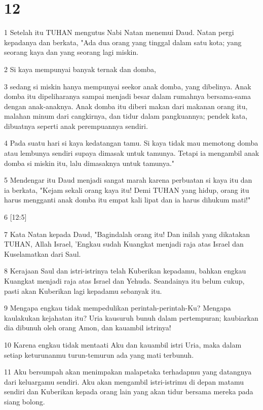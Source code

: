 \chapter{12}

\par 1 Setelah itu TUHAN mengutus Nabi Natan menemui Daud. Natan pergi kepadanya dan berkata, "Ada dua orang yang tinggal dalam satu kota; yang seorang kaya dan yang seorang lagi miskin.
\par 2 Si kaya mempunyai banyak ternak dan domba,
\par 3 sedang si miskin hanya mempunyai seekor anak domba, yang dibelinya. Anak domba itu dipeliharanya sampai menjadi besar dalam rumahnya bersama-sama dengan anak-anaknya. Anak domba itu diberi makan dari makanan orang itu, malahan minum dari cangkirnya, dan tidur dalam pangkuannya; pendek kata, dibuatnya seperti anak perempuannya sendiri.
\par 4 Pada suatu hari si kaya kedatangan tamu. Si kaya tidak mau memotong domba atau lembunya sendiri supaya dimasak untuk tamunya. Tetapi ia mengambil anak domba si miskin itu, lalu dimasaknya untuk tamunya."
\par 5 Mendengar itu Daud menjadi sangat marah karena perbuatan si kaya itu dan ia berkata, "Kejam sekali orang kaya itu! Demi TUHAN yang hidup, orang itu harus mengganti anak domba itu empat kali lipat dan ia harus dihukum mati!"
\par 6 [12:5]
\par 7 Kata Natan kepada Daud, "Bagindalah orang itu! Dan inilah yang dikatakan TUHAN, Allah Israel, 'Engkau sudah Kuangkat menjadi raja atas Israel dan Kuselamatkan dari Saul.
\par 8 Kerajaan Saul dan istri-istrinya telah Kuberikan kepadamu, bahkan engkau Kuangkat menjadi raja atas Israel dan Yehuda. Seandainya itu belum cukup, pasti akan Kuberikan lagi kepadamu sebanyak itu.
\par 9 Mengapa engkau tidak mempedulikan perintah-perintah-Ku? Mengapa kaulakukan kejahatan itu? Uria kausuruh bunuh dalam pertempuran; kaubiarkan dia dibunuh oleh orang Amon, dan kauambil istrinya!
\par 10 Karena engkau tidak mentaati Aku dan kauambil istri Uria, maka dalam setiap keturunanmu turun-temurun ada yang mati terbunuh.
\par 11 Aku bersumpah akan menimpakan malapetaka terhadapmu yang datangnya dari keluargamu sendiri. Aku akan mengambil istri-istrimu di depan matamu sendiri dan Kuberikan kepada orang lain yang akan tidur bersama mereka pada siang bolong.
